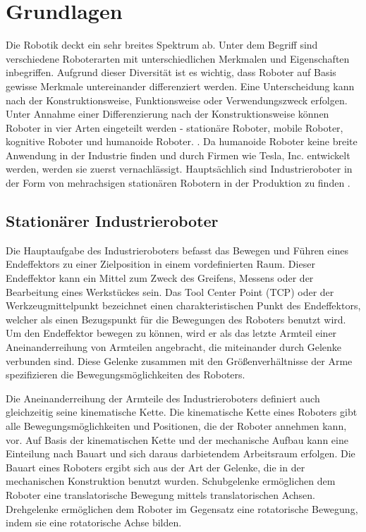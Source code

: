 \chapter{Grundlagen}
Die Robotik deckt ein sehr breites Spektrum ab. Unter dem Begriff sind verschiedene Roboterarten mit unterschiedlichen Merkmalen und Eigenschaften inbegriffen. Aufgrund dieser Diversität ist es wichtig, dass Roboter auf Basis gewisse Merkmale untereinander differenziert werden. Eine Unterscheidung kann nach der Konstruktionsweise, Funktionsweise oder Verwendungszweck erfolgen. Unter Annahme einer Differenzierung nach der Konstruktionsweise können Roboter in vier Arten eingeteilt werden - stationäre Roboter, mobile Roboter, kognitive Roboter und humanoide Roboter. \autocite[24]{maier2022grundlagen}. Da humanoide Roboter keine breite Anwendung in der Industrie finden und durch Firmen wie Tesla, Inc. \autocite{morris2022} entwickelt werden, werden sie zuerst vernachlässigt. Hauptsächlich sind Industrieroboter in der Form von mehrachsigen stationären Robotern in der Produktion zu finden \autocite[25]{maier2022grundlagen}.

\section{Stationärer Industrieroboter}
Die Hauptaufgabe des Industrieroboters befasst das Bewegen und Führen eines Endeffektors zu einer Zielposition in einem vordefinierten Raum. Dieser Endeffektor kann ein Mittel zum Zweck des Greifens, Messens oder der Bearbeitung eines Werkstückes sein. Das Tool Center Point (TCP) oder der Werkzeugmittelpunkt bezeichnet einen charakteristischen Punkt des Endeffektors, welcher als einen Bezugspunkt für die Bewegungen des Roboters benutzt wird. Um den Endeffektor bewegen zu können, wird er als das letzte Armteil einer Aneinanderreihung von Armteilen angebracht, die miteinander durch Gelenke verbunden sind. Diese Gelenke zusammen mit den Größenverhältnisse der Arme spezifizieren die Bewegungsmöglichkeiten des Roboters. \autocite[64]{maier2022grundlagen}

Die Aneinanderreihung der Armteile des Industrieroboters definiert auch gleichzeitig seine kinematische Kette. Die kinematische Kette eines Roboters gibt alle Bewegungsmöglichkeiten und Positionen, die der Roboter annehmen kann, vor. Auf Basis der kinematischen Kette und der mechanische Aufbau kann eine Einteilung nach Bauart und sich daraus darbietendem Arbeitsraum erfolgen. Die Bauart eines Roboters ergibt sich aus der Art der Gelenke, die in der mechanischen Konstruktion benutzt wurden. Schubgelenke ermöglichen dem Roboter eine translatorische Bewegung mittels translatorischen Achsen. Drehgelenke ermöglichen dem Roboter im Gegensatz eine rotatorische Bewegung, indem sie eine rotatorische Achse bilden. \autocite[114-115]{maier2022grundlagen}

